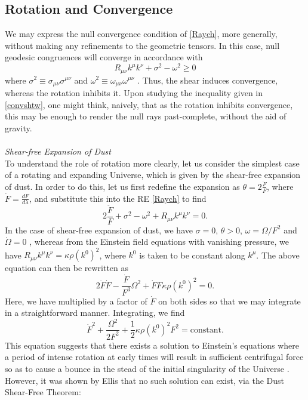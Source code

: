 \subsection{Rotation and Convergence}
We may express the null convergence condition of \eqref{Raych}, more generally, without making any refinements to the geometric tensors. In this case, null geodesic congruences will converge in accordance with \cite{Kar:2006ms}
\[
\label{convshtw}
R_{\mu\nu}k^\mu k^\nu +\sigma^2 -\omega^2 \geq 0
\]
where $\sigma^2 \equiv \sigma_{\mu\nu}\sigma^{\mu\nu}$ and $\omega^2 \equiv \omega_{\mu\nu}\omega ^{\mu\nu}$ \cite{Kar:2006ms}. Thus, the shear induces convergence, whereas the rotation inhibits it. Upon studying the inequality given in \eqref{convshtw}, one might think, naively, that as the rotation inhibits convergence, this may be enough to render the null rays past-complete, without the aid of gravity.
\\\\\emph{Shear-free Expansion of Dust}\\ To understand the role of rotation more clearly, let us consider the simplest case of a rotating and expanding Universe, which is given by the shear-free expansion of dust. In order to do this, let us first redefine the expansion as $\theta =2\frac{{\dot F}}{F}$, where ${\dot F}=\frac{dF}{d\lambda}$, and substitute this into the RE \eqref{Raych} to find \cite{Tipler:1977zzb}
\[
2\frac{{\ddot F}}{F}+\sigma^{2}-\omega^{2}+R_{\mu\nu}k^{\mu}k^{\nu}=0
.\]
In the case of shear-free expansion of dust, we have $\sigma=0$, $\theta>0$, $\omega=\Omega/F^2$ and ${\dot \Omega}=0$ \cite{ellis2012relativistic}, whereas from the Einstein field equations with vanishing pressure, we have $R_{\mu\nu}k^{\mu}k^{\nu}=\kappa\rho(k^0)^2$, where $k^0$ is taken to be constant along $k^{\mu}$. The above equation can then be rewritten as
\[
2{\ddot{F}}\dot{F}-\frac{\dot{F}}{F^{3}}\Omega^{2}+\dot{F}F\kappa\rho(k^{0})^{2}=0.
\]
Here, we have multiplied by a factor of ${\dot F}$ on both sides so that we may integrate in a straightforward manner. Integrating, we find
\[
\label{dustF}
\dot{F}^{2}+\frac{\Omega^{2}}{2F^{2}}+\frac{1}{2}\kappa\rho(k^{0})^{2}F^{2}=\mbox{constant}
.\]
This equation suggests that there exists a solution to Einstein's equations where a period of intense rotation at early times will result in sufficient centrifugal force so as to cause a bounce in the stead of the initial singularity of the Universe \cite{ellis2012relativistic}. However,  it was shown by Ellis \cite{Ellis:1966ta} that no such solution can exist, via the Dust Shear-Free Theorem:

